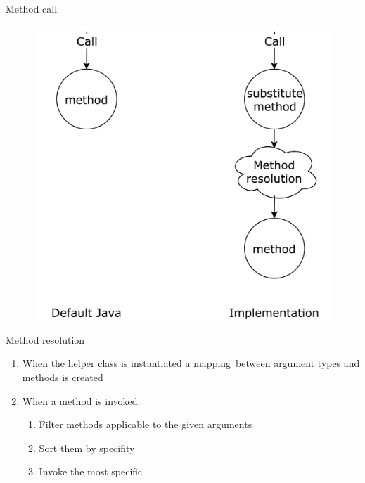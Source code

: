 \documentclass[13pt]{beamer}
\begin{document}
\begin{frame}{Method call}
  \begin{figure}
    \includegraphics[height=0.78\textheight]{figures/callChain.png}
  \end{figure}
\end{frame}

\begin{frame}{Method resolution}

  \begin{enumerate}
    \item When the helper class is instantiated a mapping\
      between argument types and methods is created
    \item When a method is invoked: {
      \begin{enumerate}
        \item Filter methods applicable to the given arguments 
        \item Sort them by specifity
        \item Invoke the most specific
      \end{enumerate}
    }
  \end{enumerate}
\end{frame}
\end{document}
